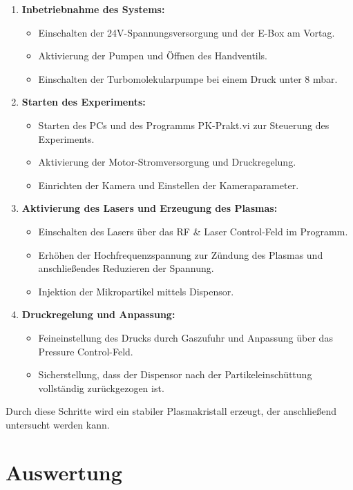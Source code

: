 \documentclass[12pt,a4paper,ngerman]{article}
\begin{document}
\begin{enumerate}
    \item \textbf{Inbetriebnahme des Systems:}
    \begin{itemize}
        \item Einschalten der 24V-Spannungsversorgung und der E-Box am Vortag.
        \item Aktivierung der Pumpen und Öffnen des Handventils.
        \item Einschalten der Turbomolekularpumpe bei einem Druck unter 8 mbar.
    \end{itemize}
    \item \textbf{Starten des Experiments:}
    \begin{itemize}
        \item Starten des PCs und des Programms \glqq{}PK-Prakt.vi\grqq{} zur Steuerung des Experiments.
        \item Aktivierung der Motor-Stromversorgung und Druckregelung.
        \item Einrichten der Kamera und Einstellen der Kameraparameter.
    \end{itemize}
    \item \textbf{Aktivierung des Lasers und Erzeugung des Plasmas:}
    \begin{itemize}
        \item Einschalten des Lasers über das \glqq{}RF \& Laser Control\grqq{}-Feld im Programm.
        \item Erhöhen der Hochfrequenzspannung zur Zündung des Plasmas und anschließendes Reduzieren der Spannung.
        \item Injektion der Mikropartikel mittels Dispensor.
    \end{itemize}
    \item \textbf{Druckregelung und Anpassung:}
    \begin{itemize}
        \item Feineinstellung des Drucks durch Gaszufuhr und Anpassung über das \glqq{}Pressure Control\grqq{}-Feld.
        \item Sicherstellung, dass der Dispensor nach der Partikeleinschüttung vollständig zurückgezogen ist.
    \end{itemize}
\end{enumerate}

Durch diese Schritte wird ein stabiler Plasmakristall erzeugt, der anschließend untersucht werden kann.	


\section{Auswertung}
	
\end{document}
